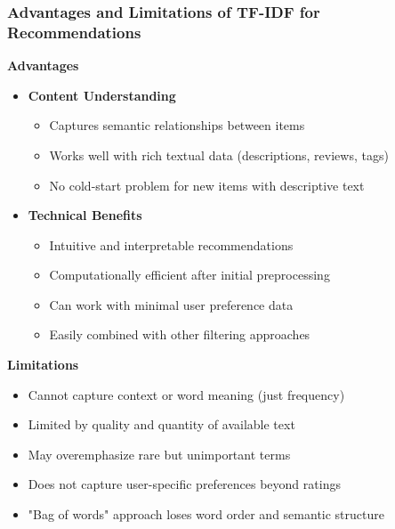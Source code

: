 \documentclass{beamer}
\begin{document}
\begin{frame}
\frametitle{Advantages and Limitations of TF-IDF for Recommendations}

\textbf{Advantages}
\begin{itemize}
    \item \textbf{Content Understanding}
    \begin{itemize}
        \item Captures semantic relationships between items
        \item Works well with rich textual data (descriptions, reviews, tags)
        \item No cold-start problem for new items with descriptive text
    \end{itemize}
    
    \item \textbf{Technical Benefits}
    \begin{itemize}
        \item Intuitive and interpretable recommendations
        \item Computationally efficient after initial preprocessing
        \item Can work with minimal user preference data
        \item Easily combined with other filtering approaches
    \end{itemize}
\end{itemize}

\textbf{Limitations}
\begin{itemize}
    \item Cannot capture context or word meaning (just frequency)
    \item Limited by quality and quantity of available text
    \item May overemphasize rare but unimportant terms
    \item Does not capture user-specific preferences beyond ratings
    \item "Bag of words" approach loses word order and semantic structure
\end{itemize}
\end{frame}
\end{document}
